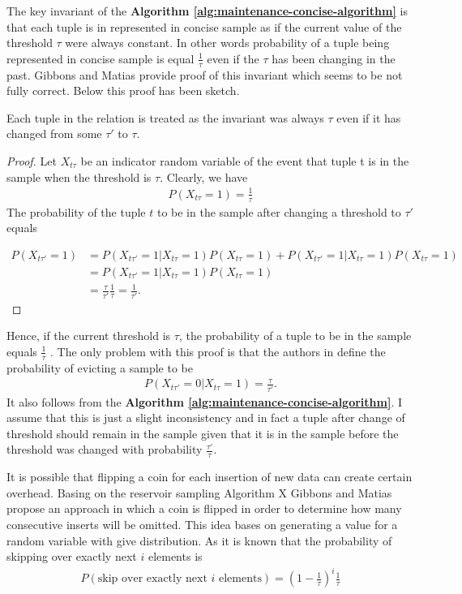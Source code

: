 The key invariant of the \textbf{Algorithm
  \ref{alg:maintenance-concise-algorithm}} is that each tuple is in
represented in concise sample as if the current value of the threshold
$\tau$ were always constant. In other words probability of a tuple being
represented in concise sample is equal $\frac{1}{\tau}$ even if the
$\tau$ has been changing in the past. Gibbons and Matias \cite{GM98} provide proof
of this invariant which seems to be not fully correct. Below this
proof has been sketch.
\begin{theorem}
Each tuple in the relation is treated as the invariant was always
$\tau$ even if it has changed from some $\tau'$ to $\tau$.
\end{theorem}
\begin{proof}
Let $X_{t\tau}$ be an indicator random variable of the event that tuple
t is in the sample when the threshold is $\tau$. Clearly, we have
\begin{align*}
P(X_{t\tau} = 1) = \frac{1}{\tau}
\end{align*}
The probability of the tuple $t$ to be in the sample after changing a
threshold to $\tau'$ equals

\begin{align*}
  P(X_{t\tau'} = 1) &= P(X_{t\tau'} = 1 | X_{t\tau} = 1) P(X_{t\tau} = 1)
  + P(X_{t\tau'} = 1 | X_{t\tau} = 1) P(X_{t\tau} = 1) \\
  &=  P(X_{t\tau'} = 1 | X_{t\tau} = 1) P(X_{t\tau} = 1) \\
  &= \frac{\tau}{\tau'} \frac{1}{\tau} = \frac{1}{\tau'}.
\end{align*}
\end{proof}
Hence, if the current threshold is $\tau$, the probability of a tuple
to be in the sample equals $\frac{1}{\tau}$ . The only problem
with this proof is that the authors in \cite{GM98} define the
probability of evicting a sample to be
\begin{align*}
P(X_{t\tau'} = 0 | X_{t\tau} = 1) = \frac{\tau}{\tau'}.
\end{align*}
It also follows from the
\textbf{Algorithm \ref{alg:maintenance-concise-algorithm}}. I assume
that this is just a slight inconsistency and in fact a tuple after
change of threshold should
remain in the sample given that it is in the sample before the
threshold was changed with probability $\frac{\tau'}{\tau}$.

It is possible that flipping a coin for each insertion of new data can
create certain overhead. Basing on the reservoir sampling Algorithm X
\cite{Vit85} Gibbons and Matias propose an approach in which a coin is
flipped in order to determine how many consecutive inserts will be
omitted. This idea bases on generating a value for a random
variable with give distribution. As it is known that the probability
of skipping over exactly next $i$ elements is
\begin{align*}
P(\text{skip over exactly next $i$ elements}) = \left( 1 - \frac{1}{\tau}\right)^i\frac{1}{\tau}
\end{align*}

